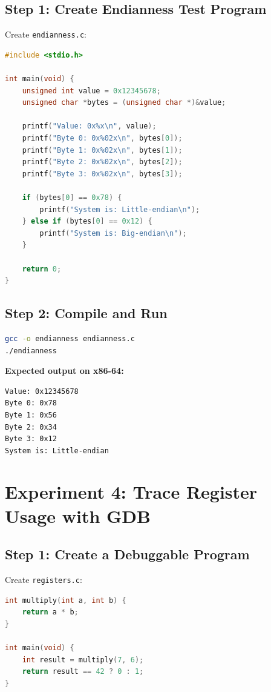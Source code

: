 \subsection{Step 1: Create Endianness Test Program}

Create \texttt{endianness.c}:

\begin{lstlisting}[language=C]
#include <stdio.h>

int main(void) {
    unsigned int value = 0x12345678;
    unsigned char *bytes = (unsigned char *)&value;

    printf("Value: 0x%x\n", value);
    printf("Byte 0: 0x%02x\n", bytes[0]);
    printf("Byte 1: 0x%02x\n", bytes[1]);
    printf("Byte 2: 0x%02x\n", bytes[2]);
    printf("Byte 3: 0x%02x\n", bytes[3]);

    if (bytes[0] == 0x78) {
        printf("System is: Little-endian\n");
    } else if (bytes[0] == 0x12) {
        printf("System is: Big-endian\n");
    }

    return 0;
}
\end{lstlisting}

\subsection{Step 2: Compile and Run}

\begin{lstlisting}[language=bash]
gcc -o endianness endianness.c
./endianness
\end{lstlisting}

\textbf{Expected output on x86-64:}

\begin{lstlisting}
Value: 0x12345678
Byte 0: 0x78
Byte 1: 0x56
Byte 2: 0x34
Byte 3: 0x12
System is: Little-endian
\end{lstlisting}

\section{Experiment 4: Trace Register Usage with GDB}

\subsection{Step 1: Create a Debuggable Program}

Create \texttt{registers.c}:

\begin{lstlisting}[language=C]
int multiply(int a, int b) {
    return a * b;
}

int main(void) {
    int result = multiply(7, 6);
    return result == 42 ? 0 : 1;
}
\end{lstlisting}

